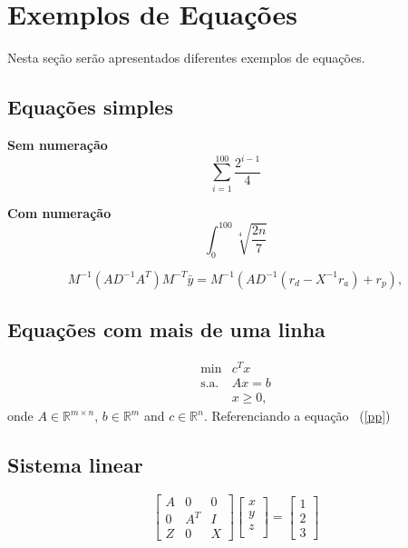 \documentclass[12pt,fleqn]{article}
\newcommand{\Rn}{{\ensuremath{\mathbb{R}}}^{n}}
\newcommand{\Rm}{{\ensuremath{\mathbb{R}}}^{m}}
\newcommand{\Rmn}{{\ensuremath{\mathbb{R}}}^{{m}\times{n}}}
\begin{document}
\section{Exemplos de Equações}
Nesta seção serão apresentados diferentes exemplos de equações.

\subsection{Equações simples}

\textbf{Sem numeração}
\[\sum_{i=1}^{100}\frac{2^{i-1}}{4}\]




\textbf{Com numeração}
\begin{equation}
	\int_{0}^{100}\sqrt[4]{\frac{2n}{7}}
\end{equation}

\begin{equation}
M^{-1}(AD^{-1}A^T)M^{-T}\bar{y} = M^{-1}(AD^{-1}(r_d -X^{-1}r_a) + r_p),
\end{equation}


\subsection{Equações com mais de uma linha}
\begin{eqnarray}
\label{pp} %
\min & c^Tx \\ \nonumber
\mbox{s.a.} & Ax=b \\ \nonumber
            & x \geq 0, \nonumber
\end{eqnarray}
onde $A \in \Rmn$, $b \in \Rm$ and $c \in \Rn$.
Referenciando a equação ~(\ref{pp})

\subsection{Sistema linear}

\begin{equation}
 \left[
\begin{array}{ccc}
 A & 0   & 0 \\
 0 & A^T & I\\
 Z & 0   & X
\end{array} \right]
\left[
\begin{array}{c}
 x \\
 y \\
 z \\
\end{array}
\right]
=
\left[
\begin{array}{c}
 1 \\
 2 \\
 3
\end{array}
\right]
\label{eqpc0}
\end{equation}
\end{document}
